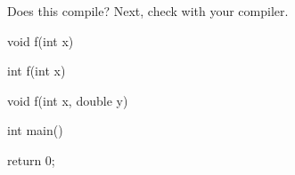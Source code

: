 Does this compile? Next, check with your compiler.



\begin{consolethree}[escapeinside=||]

void f(int x) {}

int f(int x) {}

void f(int x, double y) {}



int main()

{

    return 0;

}

\end{consolethree}

